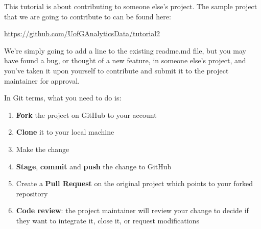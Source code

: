 \documentclass[
  letterpaper,
  DIV=11,
  numbers=noendperiod]{scrartcl}
\providecommand{\tightlist}{%
  \setlength{\itemsep}{0pt}\setlength{\parskip}{0pt}}\usepackage{longtable,booktabs,array}
\begin{document}
This tutorial is about contributing to someone else's project. The
sample project that we are going to contribute to can be found here:

\url{https://github.com/UofGAnalyticsData/tutorial2}

We're simply going to add a line to the existing readme.md file, but you
may have found a bug, or thought of a new feature, in someone else's
project, and you've taken it upon yourself to contribute and submit it
to the project maintainer for approval.

In Git terms, what you need to do is:

\begin{enumerate}
\def\labelenumi{\arabic{enumi}.}
\tightlist
\item
  \textbf{Fork} the project on GitHub to your account
\item
  \textbf{Clone} it to your local machine
\item
  Make the change
\item
  \textbf{Stage}, \textbf{commit} and \textbf{push} the change to GitHub
\item
  Create a \textbf{Pull Request} on the original project which points to
  your forked repository
\item
  \textbf{Code review}: the project maintainer will review your change
  to decide if they want to integrate it, close it, or request
  modifications
\end{enumerate}
\end{document}
